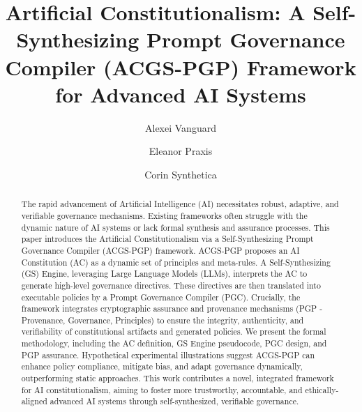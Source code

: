 \documentclass[sigconf,review,screen]{acmart}
\begin{document}
\title{Artificial Constitutionalism: A Self-Synthesizing Prompt Governance Compiler (ACGS-PGP) Framework for Advanced AI Systems}

\author{Alexei Vanguard}

\author{Eleanor Praxis}

\author{Corin Synthetica}

\renewcommand{\shortauthors}{Vanguard, Praxis, and Synthetica}

\begin{abstract} %
The rapid advancement of Artificial Intelligence (AI) necessitates robust, adaptive, and verifiable governance mechanisms. Existing frameworks often struggle with the dynamic nature of AI systems or lack formal synthesis and assurance processes. This paper introduces the Artificial Constitutionalism via a Self-Synthesizing Prompt Governance Compiler (ACGS-PGP) framework. ACGS-PGP proposes an AI Constitution (AC) as a dynamic set of principles and meta-rules. A Self-Synthesizing (GS) Engine, leveraging Large Language Models (LLMs), interprets the AC to generate high-level governance directives. These directives are then translated into executable policies by a Prompt Governance Compiler (PGC). Crucially, the framework integrates cryptographic assurance and provenance mechanisms (PGP - Provenance, Governance, Principles) to ensure the integrity, authenticity, and verifiability of constitutional artifacts and generated policies. We present the formal methodology, including the AC definition, GS Engine pseudocode, PGC design, and PGP assurance. Hypothetical experimental illustrations suggest ACGS-PGP can enhance policy compliance, mitigate bias, and adapt governance dynamically, outperforming static approaches. This work contributes a novel, integrated framework for AI constitutionalism, aiming to foster more trustworthy, accountable, and ethically-aligned advanced AI systems through self-synthesized, verifiable governance.
\end{abstract}
\end{document}
